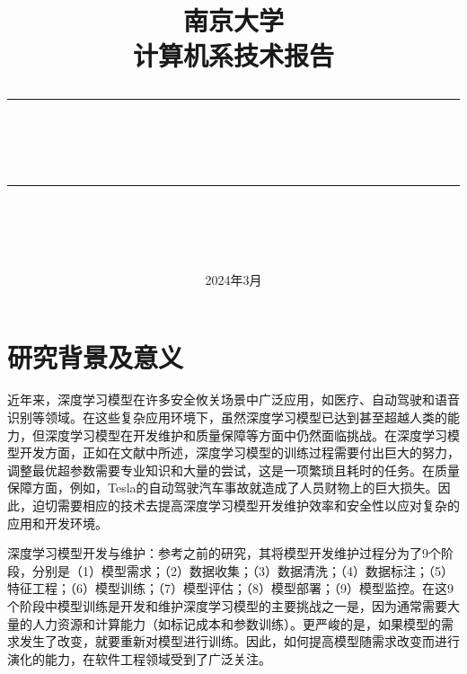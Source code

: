 \documentclass[fontset=macnew,UTF8]{article} %
\newcommand{\horrule}[1]{\rule[0.5ex]{\linewidth}{#1}} 	%
\begin{document}
\title{
{\textsc{
南京大学\\
计算机系技术报告 \\[150pt]}}
\horrule{2.5pt}\\
\horrule{1.8pt}\\[150pt]
}
\date{2024年3月} %

\begin{titlepage}
\maketitle
\vspace{30pt}
\thispagestyle{empty}
\end{titlepage}

\tableofcontents
\thispagestyle{empty}

\newpage
\setcounter{page}{1}

\section{研究背景及意义}
近年来，深度学习模型在许多安全攸关场景中广泛应用，如医疗\cite{medical}、自动驾驶\cite{self_Driving}和语音识别\cite{speech_recognition}等领域。在这些复杂应用环境下，虽然深度学习模型已达到甚至超越人类的能力，但深度学习模型在开发维护\cite{menghani2023efficient}和质量保障\cite{chakraborty2019software}等方面中仍然面临挑战。在深度学习模型开发方面，正如在文献\cite{mohammed2023comprehensive}中所述，深度学习模型的训练过程需要付出巨大的努力，调整最优超参数需要专业知识和大量的尝试，这是一项繁琐且耗时的任务。在质量保障方面，例如，Tesla的自动驾驶汽车事故就造成了人员财物上的巨大损失\cite{Tesla}。因此，迫切需要相应的技术去提高深度学习模型开发维护效率和安全性以应对复杂的应用和开发环境。

深度学习模型开发与维护：参考之前的研究\cite{amershi2019software}，其将模型开发维护过程分为了9个阶段，分别是（1）模型需求；（2）数据收集；（3）数据清洗；（4）数据标注；（5）特征工程；（6）模型训练；（7）模型评估；（8）模型部署；（9）模型监控。在这9个阶段中模型训练是开发和维护深度学习模型的主要挑战之一是，因为通常需要大量的人力资源和计算能力（如标记成本和参数训练）。更严峻的是，如果模型的需求发生了改变，就要重新对模型进行训练。因此，如何提高模型随需求改变而进行演化的能力，在软件工程领域受到了广泛关注。
\end{document}
